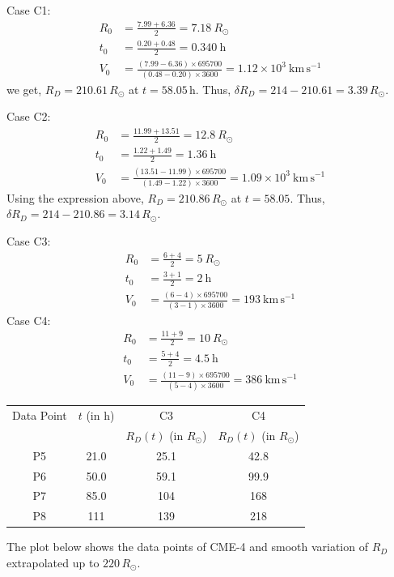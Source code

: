 \begin{description}
  Case C1:
  \begin{align*}
  R_0 &= \frac{7.99+6.36}{2} = 7.18~R_\odot\\
  t_0 &= \frac{0.20+0.48}{2} = 0.340~\mathrm{h}\\
  V_0 &= \frac{(7.99-6.36)\times 695700}{(0.48-0.20)\times 3600}
       = 1.12\times 10^{3}~\mathrm{km\,s^{-1}}
  \end{align*}
  we get, $R_D = 210.61\,R_\odot$ at $t = 58.05$\,h. Thus,
  $\delta R_D = 214 - 210.61 = 3.39\,R_\odot$.

  Case C2:
  \begin{align*}
  R_0 &= \frac{11.99+13.51}{2} = 12.8~R_\odot\\
  t_0 &= \frac{1.22+1.49}{2} = 1.36~\mathrm{h}\\
  V_0 &= \frac{(13.51-11.99)\times 695700}{(1.49-1.22)\times 3600}
       = 1.09\times 10^{3}~\mathrm{km\,s^{-1}}
  \end{align*}
  Using the expression above, $R_D = 210.86\,R_\odot$ at $t=58.05$. Thus,
  $\delta R_D = 214 - 210.86 = 3.14\,R_\odot$.
\item[(D02.3b)] Case C3:
  \begin{align*}
  R_0 &= \frac{6+4}{2} = 5~R_\odot\\
  t_0 &= \frac{3+1}{2} = 2~\mathrm{h}\\
  V_0 &= \frac{(6-4)\times 695700}{(3-1)\times 3600} = 193~\mathrm{km\,s^{-1}}
  \end{align*}
  Case C4:
  \begin{align*}
  R_0 &= \frac{11+9}{2} = 10~R_\odot\\
  t_0 &= \frac{5+4}{2} = 4.5~\mathrm{h}\\
  V_0 &= \frac{(11-9)\times 695700}{(5-4)\times 3600} = 386~\mathrm{km\,s^{-1}}
  \end{align*}
  \begin{center}
  \begin{tabular}{c c c c}
  \toprule
  Data Point & $t$ (in h) & C3 & C4\\
  & & $R_D(t)$ (in $R_\odot$) & $R_D(t)$ (in $R_\odot$)\\
  \midrule
  P5 & 21.0 & 25.1 & 42.8\\
  P6 & 50.0 & 59.1 & 99.9\\
  P7 & 85.0 & 104  & 168\\
  P8 & 111  & 139  & 218\\
  \bottomrule
  \end{tabular}
  \end{center}
\item[(D02.3c)] The plot below shows the data points of CME-4 and smooth
  variation of $R_D$ extrapolated up to $220\,R_\odot$.


\end{description}
